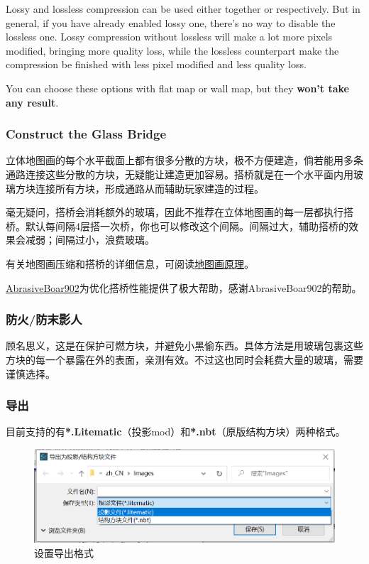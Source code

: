 \documentclass{article}
\begin{document}
    Lossy and lossless compression can be used either together or respectively. But in general, if you have already enabled lossy one, there's no way to disable the lossless one. Lossy compression without lossless will make a lot more pixels modified, bringing more quality loss, while the lossless counterpart make the compression be finished with less pixel modified and less quality loss.
    
    You can choose these options with flat map or wall map, but they \textbf{won't take any result}.

    \subsubsection{Construct the Glass Bridge}
    立体地图画的每个水平截面上都有很多分散的方块，极不方便建造，倘若能用多条通路连接这些分散的方块，无疑能让建造更加容易。搭桥就是在一个水平面内用玻璃方块连接所有方块，形成通路从而辅助玩家建造的过程。
    
    毫无疑问，搭桥会消耗额外的玻璃，因此不推荐在立体地图画的每一层都执行搭桥。默认每间隔4层搭一次桥，你也可以修改这个间隔。间隔过大，辅助搭桥的效果会减弱；间隔过小，浪费玻璃。
    
    有关地图画压缩和搭桥的详细信息，可阅读\href{https://github.com/ToKiNoBug/SlopeCraftTutorial/blob/main/BasicPrinciple/Principle%20of%20map%20pixel%20arts.md}{地图画原理}。

    \href{https://github.com/AbrasiveBoar902}{AbrasiveBoar902}为优化搭桥性能提供了极大帮助，感谢AbrasiveBoar902的帮助。

    \subsubsection{防火/防末影人}
    顾名思义，这是在保护可燃方块，并避免小黑偷东西。具体方法是用玻璃包裹这些方块的每一个暴露在外的表面，亲测有效。不过这也同时会耗费大量的玻璃，需要谨慎选择。

    \subsubsection{导出}
    目前支持的有\textbf{*.Litematic}（投影mod）和\textbf{*.nbt}（原版结构方块）两种格式。

    \begin{figure}[htbp]
        \centering
        \includegraphics[width=15cm]{Img7_SelectFormat.png}
        \caption{设置导出格式}
        \label{setExport3DFormat}
    \end{figure}
\end{document}
